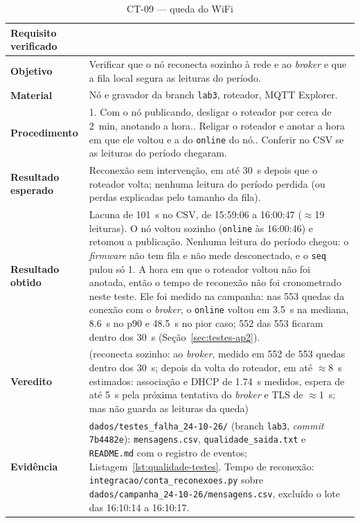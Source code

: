 \begin{table}[H]
\centering
\caption{CT-09 --- queda do WiFi}
\label{tab:ct09}
\footnotesize
\setlength{\tabcolsep}{3.5pt}
\begin{tabular}{@{}L{3.2cm}L{12.0cm}@{}}
\toprule
\textbf{Requisito verificado} &  \\
\midrule
\textbf{Objetivo} & Verificar que o nó reconecta sozinho à rede e ao \emph{broker} e que a fila local segura as leituras do período. \\
\textbf{Material} & Nó e gravador da branch \texttt{lab3}, roteador, MQTT Explorer. \\
\textbf{Procedimento} &
  1. Com o nó publicando, desligar o roteador por cerca de \SI{2}{\minute}, anotando a hora.. Religar o roteador e anotar a hora em que ele voltou e a do \texttt{online} do nó.. Conferir no CSV se as leituras do período chegaram. \\
\textbf{Resultado esperado} & Reconexão sem intervenção, em até \SI{30}{\second} depois que o roteador volta; nenhuma leitura do período perdida (ou perdas explicadas pelo tamanho da fila). \\
\textbf{Resultado obtido} & Lacuna de \SI{101}{\second} no CSV, de 15:59:06 a 16:00:47 ($\approx$19 leituras). O nó voltou sozinho (\texttt{online} às 16:00:46) e retomou a publicação. Nenhuma leitura do período chegou: o \emph{firmware} não tem fila e não mede desconectado, e o \texttt{seq} pulou só 1. A hora em que o roteador voltou não foi anotada, então o tempo de reconexão não foi cronometrado neste teste. Ele foi medido na campanha: nas 553 quedas da conexão com o \emph{broker}, o \texttt{online} voltou em \SI{3,5}{\second} na mediana, \SI{8,6}{\second} no p90 e \SI{48,5}{\second} no pior caso; 552 das 553 ficaram dentro dos \SI{30}{\second} (Seção~\ref{sec:testes-ap2}). \\
\textbf{Veredito} & \parcial{} (reconecta sozinho: ao \emph{broker}, medido em 552 de 553 quedas dentro dos \SI{30}{\second}; depois da volta do roteador, em até $\approx$\SI{8}{\second} estimados: associação e DHCP de \SI{1,74}{\second} medidos, espera de até \SI{5}{\second} pela próxima tentativa do \emph{broker} e TLS de $\approx$\SI{1}{\second}; mas não guarda as leituras da queda) \\
\textbf{Evidência} & \texttt{dados/testes\_falha\_24-10-26/} (branch \texttt{lab3}, \emph{commit} \texttt{7b4482e}): \texttt{mensagens.csv}, \texttt{qualidade\_saida.txt} e \texttt{README.md} com o registro de eventos; Listagem~\ref{lst:qualidade-testes}. Tempo de reconexão: \texttt{integracao/conta\_reconexoes.py} sobre \texttt{dados/campanha\_24-10-26/mensagens.csv}, excluído o lote das 16:10:14 a 16:10:17. \\
\bottomrule
\end{tabular}
\end{table}

